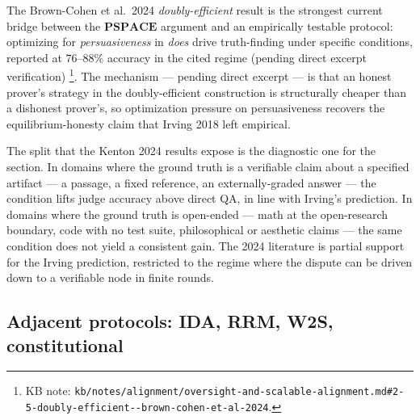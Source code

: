 The Brown-Cohen et al.\ 2024 \emph{doubly-efficient } result
 is the strongest current bridge between the
$\mathbf{PSPACE}$ argument and an empirically testable protocol:
optimizing for \emph{persuasiveness} in  \emph{does} drive
truth-finding under specific conditions, reported at $76$--$88\%$
accuracy in the cited regime (pending direct excerpt verification)%
\footnote{KB note: \texttt{kb/notes/alignment/oversight-and-scalable-alignment.md\#2-5-doubly-efficient--brown-cohen-et-al-2024}.}.
The mechanism --- pending direct excerpt --- is that an honest
prover's strategy in the doubly-efficient construction is structurally
cheaper than a dishonest prover's, so optimization pressure on
persuasiveness recovers the equilibrium-honesty claim that Irving
2018 left empirical.

The split that the Kenton 2024 results expose is the diagnostic one
for the section. In domains where the ground truth is a verifiable
claim about a specified artifact --- a passage, a fixed reference, an
externally-graded answer --- the  condition lifts judge
accuracy above direct QA, in line with Irving's prediction. In domains
where the ground truth is open-ended --- math at the open-research
boundary, code with no test suite, philosophical or aesthetic claims
--- the same condition does not yield a consistent gain. The 2024
literature is partial support for the Irving prediction, restricted
to the regime where the dispute can be driven down to a verifiable
node in finite rounds.

\subsection{Adjacent protocols: IDA, RRM, W2S, constitutional}
\label{sec:oversight-adjacent}

